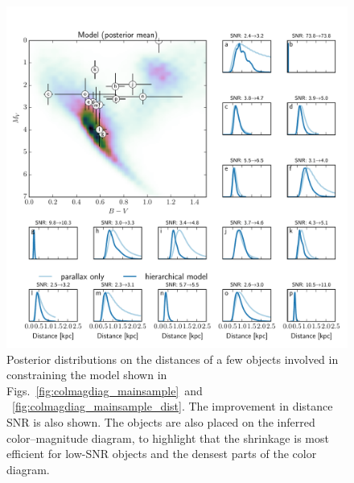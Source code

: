 \documentclass[manuscript, letterpaper]{aastex6}
\newcommand{\figrefs}[2]{{\xspace}Figs.~\ref{#1}~and ~\ref{#2}}
\begin{document}
\begin{figure}
\hspace*{-2mm}\includegraphics[width=15.7cm]{model_dist_pdfs.pdf}
\caption{Posterior distributions on the distances of a few objects involved in constraining the model shown in \figrefs{fig:colmagdiag_mainsample}{fig:colmagdiag_mainsample_dist}. 
The improvement in distance SNR is also shown. The objects are also placed on the inferred color--magnitude diagram, to highlight that the shrinkage is most efficient for low-SNR objects and the densest parts of the color diagram.}\label{fig:model_dist_pdfs}
\end{figure}
\end{document}
